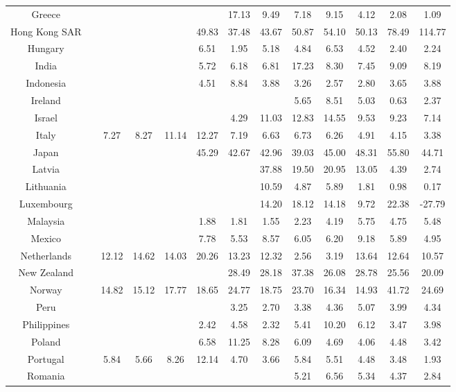 \documentclass[a4paper, twoside]{templates/ociamthesis}
\begin{document}
\begin{table}
{\begin{tabular}[t]{ccccccccccccc}
Greece &  &  &  &  &  & 17.13 & 9.49 & 7.18 & 9.15 & 4.12 & 2.08 & 1.09\\
Hong Kong SAR &  &  &  &  & 49.83 & 37.48 & 43.67 & 50.87 & 54.10 & 50.13 & 78.49 & 114.77\\
Hungary &  &  &  &  & 6.51 & 1.95 & 5.18 & 4.84 & 6.53 & 4.52 & 2.40 & 2.24\\
India &  &  &  &  & 5.72 & 6.18 & 6.81 & 17.23 & 8.30 & 7.45 & 9.09 & 8.19\\
Indonesia &  &  &  &  & 4.51 & 8.84 & 3.88 & 3.26 & 2.57 & 2.80 & 3.65 & 3.88\\
Ireland &  &  &  &  &  &  &  & 5.65 & 8.51 & 5.03 & 0.63 & 2.37\\
Israel &  &  &  &  &  & 4.29 & 11.03 & 12.83 & 14.55 & 9.53 & 9.23 & 7.14\\
Italy &  & 7.27 & 8.27 & 11.14 & 12.27 & 7.19 & 6.63 & 6.73 & 6.26 & 4.91 & 4.15 & 3.38\\
Japan &  &  &  &  & 45.29 & 42.67 & 42.96 & 39.03 & 45.00 & 48.31 & 55.80 & 44.71\\
Latvia &  &  &  &  &  &  & 37.88 & 19.50 & 20.95 & 13.05 & 4.39 & 2.74\\
Lithuania &  &  &  &  &  &  & 10.59 & 4.87 & 5.89 & 1.81 & 0.98 & 0.17\\
Luxembourg &  &  &  &  &  &  & 14.20 & 18.12 & 14.18 & 9.72 & 22.38 & -27.79\\
Malaysia &  &  &  &  & 1.88 & 1.81 & 1.55 & 2.23 & 4.19 & 5.75 & 4.75 & 5.48\\
Mexico &  &  &  &  & 7.78 & 5.53 & 8.57 & 6.05 & 6.20 & 9.18 & 5.89 & 4.95\\
Netherlands &  & 12.12 & 14.62 & 14.03 & 20.26 & 13.23 & 12.32 & 2.56 & 3.19 & 13.64 & 12.64 & 10.57\\
New Zealand &  &  &  &  &  & 28.49 & 28.18 & 37.38 & 26.08 & 28.78 & 25.56 & 20.09\\
Norway &  & 14.82 & 15.12 & 17.77 & 18.65 & 24.77 & 18.75 & 23.70 & 16.34 & 14.93 & 41.72 & 24.69\\
Peru &  &  &  &  &  & 3.25 & 2.70 & 3.38 & 4.36 & 5.07 & 3.99 & 4.34\\
Philippines &  &  &  &  & 2.42 & 4.58 & 2.32 & 5.41 & 10.20 & 6.12 & 3.47 & 3.98\\
Poland &  &  &  &  & 6.58 & 11.25 & 8.28 & 6.09 & 4.69 & 4.06 & 4.48 & 3.42\\
Portugal &  & 5.84 & 5.66 & 8.26 & 12.14 & 4.70 & 3.66 & 5.84 & 5.51 & 4.48 & 3.48 & 1.93\\
Romania &  &  &  &  &  &  &  & 5.21 & 6.56 & 5.34 & 4.37 & 2.84\\

\end{tabular}}
\end{table}
\end{document}
